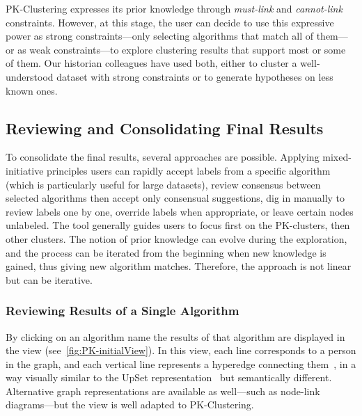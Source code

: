 PK-Clustering expresses its prior knowledge through \emph{must-link} and \emph{cannot-link} constraints. However, at this stage, the user can decide to use this expressive power as strong constraints---only selecting algorithms that match all of them---or as weak constraints---to explore clustering results that support most or some of them. Our historian colleagues have used both, either to cluster a well-understood dataset with strong constraints or to generate hypotheses on less known ones.



\subsection{Reviewing and Consolidating Final Results}
To consolidate the final results, several approaches are possible. Applying mixed-initiative principles users can rapidly accept labels from a specific algorithm (which is particularly useful for large datasets), review consensus between selected algorithms then accept only consensual suggestions, dig in manually to review labels one by one, override labels when appropriate, or leave certain nodes unlabeled.  The tool generally  guides users to focus first on the PK-clusters, then other clusters.
The notion of prior knowledge can evolve during the exploration, and the process can be iterated from the beginning when new knowledge is gained, thus giving new algorithm matches. Therefore, the approach is not linear but can be iterative.

\subsubsection{Reviewing Results of a Single Algorithm}
By clicking on an algorithm name the results of that algorithm are displayed in the \paovis view (see~\autoref{fig:PK-initialView}). In this view, each line corresponds to a person in the graph, and each vertical line represents a hyperedge connecting them~\cite{valdiviaAnalyzingDynamicHypergraphs2021}, in a way visually similar to the UpSet representation~\cite{lexUpSetVisualizationIntersecting2014} but semantically different.  Alternative graph representations are available as well---such as node-link diagrams---but the \paovis view is well adapted to PK-Clustering.

